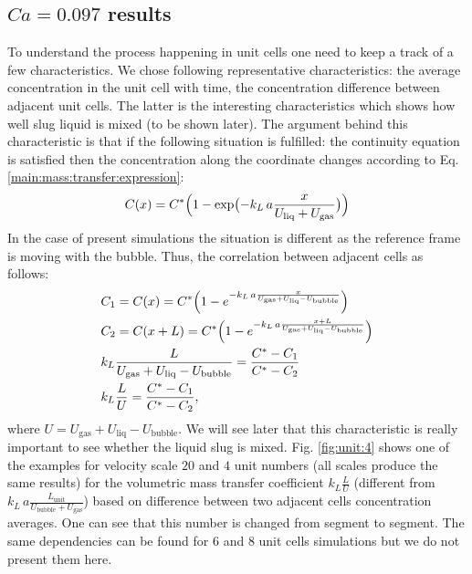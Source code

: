 \documentclass{article}
\newcommand{\beq}{\begin{equation}}
\newcommand{\feq}{\end{equation}}
\newcommand{\beqal}{\begin{equation}\begin{aligned}}
\newcommand{\feqal}{\end{aligned}\end{equation}}
\newcommand{\vol}{k_L\,a}
\newcommand{\lunit}{L_{\mathrm{unit}}}
\newcommand{\ububble}{U_{\mathrm{bubble}}}
\newcommand{\uliq}{U_{\mathrm{liq}}}
\newcommand{\ugas}{U_{\mathrm{gas}}}
\newcommand{\cstar}{C^{*}}
\newcommand{\volnondim}{\vol \frac{\lunit}{\ububble+\ugas}}
\begin{document}
\subsection{$Ca=0.097$ results}
To understand the process happening in unit cells one need to keep a track of a few
characteristics. We chose following representative characteristics: the average concentration in
the unit cell with time, the concentration difference between adjacent unit cells. The latter is
the interesting characteristics which shows how well slug liquid is mixed (to be shown later). The
argument behind this characteristic is that if the following situation is fulfilled: the continuity
equation is satisfied then the concentration along the coordinate changes according to Eq.
\ref{main:mass:transfer:expression}:
\beq
C(x)= \cstar \Bigl(1-\exp\bigl(-\vol \frac{x}{\uliq+\ugas} \bigr)\Bigr)
\feq
In the case of present simulations the situation is different as the reference frame is moving with
the bubble. Thus, the correlation between adjacent cells as follows:
\beqal
\label{volumetric:between:adjacent:cells}
&C_1=C(x)=C^* \Bigl(1-e^{-\vol \frac{x}{\ugas+\uliq-\ububble}}\Bigr)\\
&C_2=C(x+L)=C^* \Bigl(1-e^{-\vol \frac{x+L}{\ugas+\uliq-\ububble}}\Bigr)\\
&k_L\frac{L}{\ugas+\uliq-\ububble}=\frac{C^*-C_1}{C^{*}-C_2}\\
&k_L\frac{L}{U}=\frac{C^*-C_1}{C^*-C_2},
\feqal
where $U=\ugas+\uliq-\ububble$. We will see later that this characteristic is really important to
see whether the liquid slug is mixed. Fig. \ref{fig:unit:4} shows one of the examples for velocity
scale $20$ and  $4$ unit numbers (all
scales produce the same results) for the volumetric mass transfer coefficient $k_L \frac{L}{U}$
(different from $\volnondim$) based on difference
between two adjacent cells concentration averages. One can see that this number is changed from
segment to segment. The same dependencies can be found for
$6$ and $8$ unit cells simulations but we do not present them here.
\end{document}
